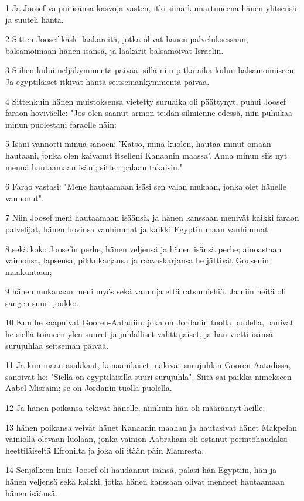 \par 1 Ja Joosef vaipui isänsä kasvoja vasten, itki siinä kumartuneena hänen ylitsensä ja suuteli häntä.
\par 2 Sitten Joosef käski lääkäreitä, jotka olivat hänen palveluksessaan, balsamoimaan hänen isänsä, ja lääkärit balsamoivat Israelin.
\par 3 Siihen kului neljäkymmentä päivää, sillä niin pitkä aika kuluu balsamoimiseen. Ja egyptiläiset itkivät häntä seitsemänkymmentä päivää.
\par 4 Sittenkuin hänen muistoksensa vietetty suruaika oli päättynyt, puhui Joosef faraon hoviväelle: "Jos olen saanut armon teidän silmienne edessä, niin puhukaa minun puolestani faraolle näin:
\par 5 Isäni vannotti minua sanoen: 'Katso, minä kuolen, hautaa minut omaan hautaani, jonka olen kaivanut itselleni Kanaanin maassa'. Anna minun siis nyt mennä hautaamaan isäni; sitten palaan takaisin."
\par 6 Farao vastasi: "Mene hautaamaan isäsi sen valan mukaan, jonka olet hänelle vannonut".
\par 7 Niin Joosef meni hautaamaan isäänsä, ja hänen kanssaan menivät kaikki faraon palvelijat, hänen hovinsa vanhimmat ja kaikki Egyptin maan vanhimmat
\par 8 sekä koko Joosefin perhe, hänen veljensä ja hänen isänsä perhe; ainoastaan vaimonsa, lapsensa, pikkukarjansa ja raavaskarjansa he jättivät Goosenin maakuntaan;
\par 9 hänen mukanaan meni myös sekä vaunuja että ratsumiehiä. Ja niin heitä oli sangen suuri joukko.
\par 10 Kun he saapuivat Gooren-Aatadiin, joka on Jordanin tuolla puolella, panivat he siellä toimeen ylen suuret ja juhlalliset valittajaiset, ja hän vietti isänsä surujuhlaa seitsemän päivää.
\par 11 Ja kun maan asukkaat, kanaanilaiset, näkivät surujuhlan Gooren-Aatadissa, sanoivat he: "Siellä on egyptiläisillä suuri surujuhla". Siitä sai paikka nimekseen Aabel-Misraim; se on Jordanin tuolla puolella.
\par 12 Ja hänen poikansa tekivät hänelle, niinkuin hän oli määrännyt heille:
\par 13 hänen poikansa veivät hänet Kanaanin maahan ja hautasivat hänet Makpelan vainiolla olevaan luolaan, jonka vainion Aabraham oli ostanut perintöhaudaksi heettiläiseltä Efronilta ja joka oli itään päin Mamresta.
\par 14 Senjälkeen kuin Joosef oli haudannut isänsä, palasi hän Egyptiin, hän ja hänen veljensä sekä kaikki, jotka hänen kanssaan olivat menneet hautaamaan hänen isäänsä.
